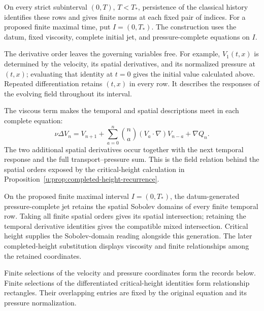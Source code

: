 On every strict subinterval \((0,T)\), \(T<T_*\), persistence of the
classical history identifies these rows and gives finite norms at each fixed
pair of indices. For a proposed finite maximal time, put \(I=(0,T_*)\).
The construction uses the datum, fixed viscosity, complete initial jet, and
pressure-complete equations on \(I\).

The derivative order leaves the governing variables free. For example,
\(V_1(t,x)\) is determined by the velocity, its spatial derivatives, and
its normalized pressure at \((t,x)\); evaluating that identity at \(t=0\)
gives the initial value calculated above. Repeated differentiation retains
\((t,x)\) in every row. It describes the responses of the evolving field
throughout its interval.

The viscous term makes the temporal and spatial descriptions meet in each
complete equation:
\begin{equation}
 \nu\Delta V_n
 =V_{n+1}
 +\sum_{a=0}^{n}\binom na(V_a\cdot\nabla)V_{n-a}
 +\nabla Q_n.
 \label{u:eq:complete-row-spatial-recovery}
\end{equation}
The two additional spatial derivatives occur together with the next temporal
response and the full transport--pressure sum. This is the field relation
behind the spatial orders exposed by the critical-height calculation in
Proposition~\ref{u:prop:completed-height-recurrence}.

On the proposed finite maximal interval \(I=(0,T_*)\), the datum-generated
pressure-complete jet retains the spatial Sobolev domains of every finite
temporal row. Taking all finite spatial orders gives its spatial
intersection; retaining the temporal derivative identities gives the
compatible mixed intersection. Critical height supplies the Sobolev-domain
reading alongside this generation. The later completed-height substitution
displays viscosity and finite relationships among the retained coordinates.

Finite selections of the velocity and pressure coordinates form the records
below. Finite selections of the differentiated critical-height identities
form relationship rectangles. Their overlapping entries are fixed by the
original equation and its pressure normalization.

